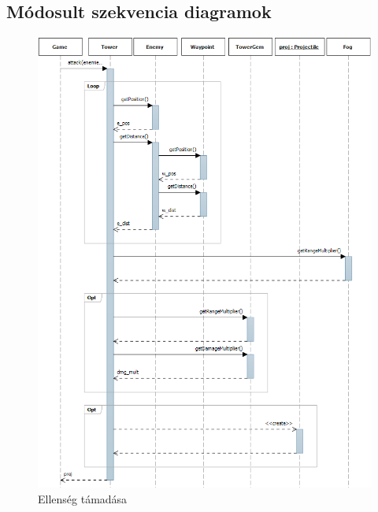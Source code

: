 \subsection{Módosult szekvencia diagramok}
\begin{figure}[H]
\begin{center}
\includegraphics[width=17cm]{images/ch07/attack_enemy.png}
\caption{Ellenség támadása}
\label{fig:enemyAttackNew}
\end{center}
\end{figure}

